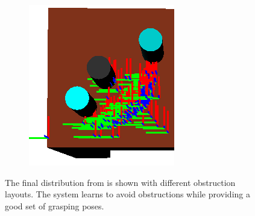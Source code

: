 \begin{figure}
\begin{subfigure}[b]{0.3\linewidth}
    \caption{}
  \end{subfigure}
  \begin{subfigure}[b]{0.3\linewidth}
    \includegraphics[width=\textwidth]{images/finalgraspobstr2.png}
    \caption{}
  \end{subfigure}
  \caption{The final distribution from 
is shown with different obstruction layouts. The system learns to
avoid obstructions while providing a good set of grasping poses.}
  \label{fig:obstr}
\end{figure}


